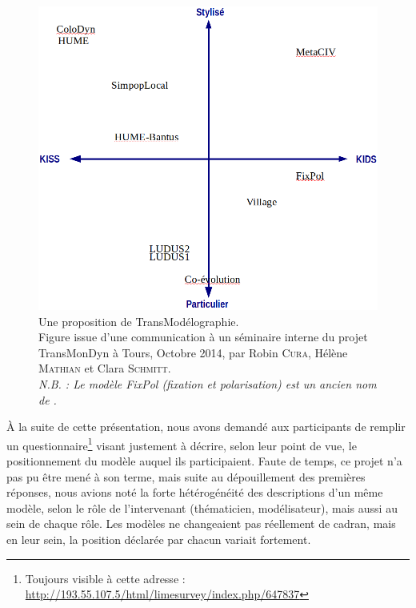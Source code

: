 \begin{figure}[H]
	\centering
	\includegraphics[width=\linewidth]{img/transmodelographie.png}
	\caption[Une proposition de \og TransModélographie\fg{}.]{Une proposition de \og TransModélographie\fg{}.\\
	Figure issue d'une communication à un séminaire interne du projet TransMonDyn à Tours, Octobre 2014, par Robin \textsc{Cura}, Hélène \textsc{Mathian} et Clara \textsc{Schmitt}.\\
	\textit{N.B. : Le modèle \og FixPol\fg{} (fixation et polarisation) est un ancien nom de \simfeodal{}.}}
	\label{fig:transmodelographie}
\end{figure}

À la suite de cette présentation, nous avons demandé aux participants de remplir un questionnaire\footnote{
	Toujours visible à cette adresse : \href{http://193.55.107.5/html/limesurvey/index.php/647837?lang=fr}{http://193.55.107.5/html/limesurvey/index.php/647837}
} visant justement à décrire, selon leur point de vue, le positionnement du modèle auquel ils participaient.
Faute de temps, ce projet n'a pas pu être mené à son terme, mais suite au dépouillement des premières réponses, nous avions noté la forte hétérogénéité des descriptions d'un même modèle, selon le rôle de l'intervenant (thématicien, modélisateur), mais aussi au sein de chaque rôle.
Les modèles ne changeaient pas réellement de cadran, mais en leur sein, la position déclarée par chacun variait fortement.

